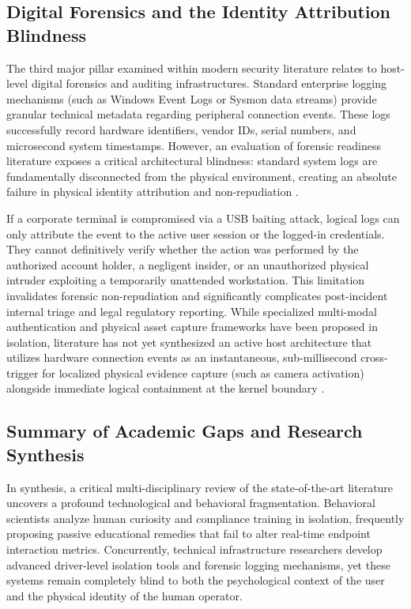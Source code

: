 \documentclass{ieeeaccess}
\begin{document}
\subsection{Digital Forensics and the Identity Attribution Blindness}
The third major pillar examined within modern security literature relates to host-level digital forensics and auditing infrastructures. Standard enterprise logging mechanisms (such as Windows Event Logs or Sysmon data streams) provide granular technical metadata regarding peripheral connection events. These logs successfully record hardware identifiers, vendor IDs, serial numbers, and microsecond system timestamps. However, an evaluation of forensic readiness literature exposes a critical architectural blindness: standard system logs are fundamentally disconnected from the physical environment, creating an absolute failure in physical identity attribution and non-repudiation .

If a corporate terminal is compromised via a USB baiting attack, logical logs can only attribute the event to the active user session or the logged-in credentials. They cannot definitively verify whether the action was performed by the authorized account holder, a negligent insider, or an unauthorized physical intruder exploiting a temporarily unattended workstation. This limitation invalidates forensic non-repudiation and significantly complicates post-incident internal triage and legal regulatory reporting. While specialized multi-modal authentication and physical asset capture frameworks have been proposed in isolation, literature has not yet synthesized an active host architecture that utilizes hardware connection events as an instantaneous, sub-millisecond cross-trigger for localized physical evidence capture (such as camera activation) alongside immediate logical containment at the kernel boundary \cite{ref12}.

\subsection{Summary of Academic Gaps and Research Synthesis}
In synthesis, a critical multi-disciplinary review of the state-of-the-art literature uncovers a profound technological and behavioral fragmentation. Behavioral scientists analyze human curiosity and compliance training in isolation, frequently proposing passive educational remedies that fail to alter real-time endpoint interaction metrics. Concurrently, technical infrastructure researchers develop advanced driver-level isolation tools and forensic logging mechanisms, yet these systems remain completely blind to both the psychological context of the user and the physical identity of the human operator.
\end{document}
